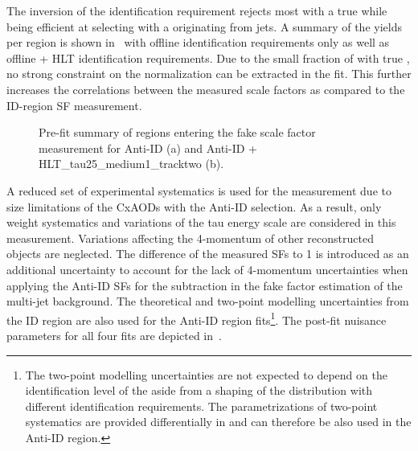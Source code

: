 The inversion of the \tauhad identification requirement rejects most
\ttbar with a true \tauhad while being efficient at selecting \ttbar
with a \tauhad originating from jets. A summary of the yields per
region is shown in~
with offline identification requirements only as well as offline + HLT
identification requirements. Due to the small fraction of \ttbar with
true \tauhad, no strong constraint on the \ttbar normalization can be
extracted in the fit. This further increases the correlations between
the measured scale factors as compared to the ID-region SF
measurement.

\begin{figure}[htbp]
  \centering


  \caption{Pre-fit summary of regions entering the \ttbar fake scale
    factor measurement for Anti-ID (a) and Anti-ID +
    HLT\_tau25\_medium1\_tracktwo (b).}
  \label{fig:ttbar_hadhad_sf_antitau_region_summary}
\end{figure}

A reduced set of experimental systematics is used for the measurement
due to size limitations of the CxAODs with the Anti-ID selection. As a
result, only weight systematics and variations of the tau energy scale
are considered in this measurement. Variations affecting the
4-momentum of other reconstructed objects are neglected. The
difference of the measured SFs to 1 is introduced as an additional
uncertainty to account for the lack of 4-momentum uncertainties when
applying the Anti-ID SFs for the subtraction in the fake factor
estimation of the multi-jet background. The theoretical and two-point
modelling uncertainties from the ID region are also used for the
Anti-ID region fits\footnote{The two-point modelling uncertainties are
  not expected to depend on the identification level of the \tauhad
  aside from a shaping of the \tauhad \pT distribution with different
  identification requirements. The parametrizations of two-point
  systematics are provided differentially in \tauhad \pT and can
  therefore be also used in the Anti-ID region.}. The post-fit
nuisance parameters for all four fits are depicted
in~.

